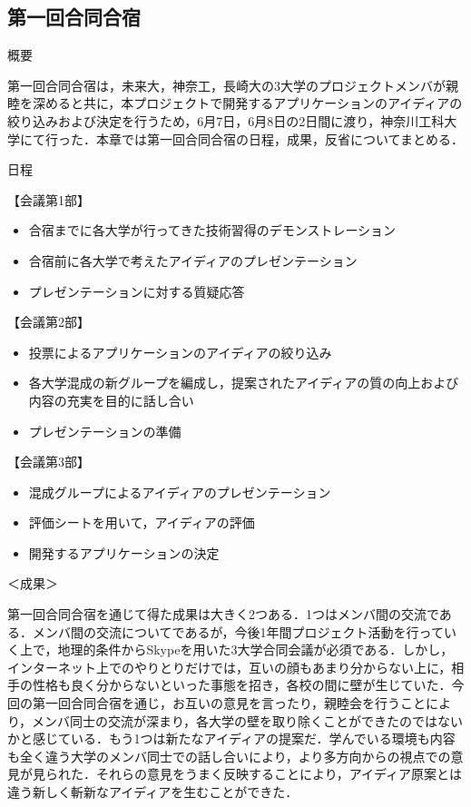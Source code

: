 \subsection{第一回合同合宿}
\par
概要
\par 
第一回合同合宿は，未来大，神奈工，長崎大の3大学のプロジェクトメンバが親睦を深めると共に，本プロジェクトで開発するアプリケーションのアイディアの絞り込みおよび決定を行うため，6月7日，6月8日の2日間に渡り，神奈川工科大学にて行った．本章では第一回合同合宿の日程，成果，反省についてまとめる．
\par
日程
\par
【会議第1部】
\begin{itemize}
\item 合宿までに各大学が行ってきた技術習得のデモンストレーション
\item 合宿前に各大学で考えたアイディアのプレゼンテーション
\item プレゼンテーションに対する質疑応答
\end{itemize}
【会議第2部】
\begin{itemize}
\item 投票によるアプリケーションのアイディアの絞り込み
\item 各大学混成の新グループを編成し，提案されたアイディアの質の向上および内容の充実を目的に話し合い
\item プレゼンテーションの準備
\end{itemize}
【会議第3部】
\begin{itemize}
\item 混成グループによるアイディアのプレゼンテーション
\item 評価シートを用いて，アイディアの評価
\item 開発するアプリケーションの決定
\end{itemize}
＜成果＞
\par  第一回合同合宿を通じて得た成果は大きく2つある．1つはメンバ間の交流である．メンバ間の交流についてであるが，今後1年間プロジェクト活動を行っていく上で，地理的条件からSkypeを用いた3大学合同会議が必須である．しかし，インターネット上でのやりとりだけでは，互いの顔もあまり分からない上に，相手の性格も良く分からないといった事態を招き，各校の間に壁が生じていた．今回の第一回合同合宿を通じ，お互いの意見を言ったり，親睦会を行うことにより，メンバ同士の交流が深まり，各大学の壁を取り除くことができたのではないかと感じている．もう1つは新たなアイディアの提案だ．学んでいる環境も内容も全く違う大学のメンバ同士での話し合いにより，より多方向からの視点での意見が見られた．それらの意見をうまく反映することにより，アイディア原案とは違う新しく斬新なアイディアを生むことができた．
